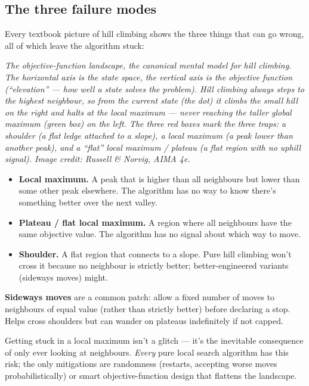 \documentclass[11pt, a4paper]{article}
\begin{document}
\subsection{The three failure modes}

Every textbook picture of hill climbing shows the three things that can go wrong, all of which leave the algorithm stuck:

\begin{center}

\footnotesize\textit{The objective-function landscape, the canonical mental model for hill climbing. The horizontal axis is the \emph{state space}, the vertical axis is the \emph{objective function} (``elevation'' --- how well a state solves the problem). Hill climbing always steps to the highest neighbour, so from the \emph{current state} (the dot) it climbs the small hill on the right and halts at the \emph{local maximum} --- never reaching the taller \emph{global maximum} (green box) on the left. The three red boxes mark the three traps: a \emph{shoulder} (a flat ledge attached to a slope), a \emph{local maximum} (a peak lower than another peak), and a \emph{``flat'' local maximum} / plateau (a flat region with no uphill signal). Image credit: Russell \& Norvig, AIMA 4e.}
\end{center}

\begin{itemize}
  \item \textbf{Local maximum.} A peak that is higher than all neighbours but lower than some other peak elsewhere. The algorithm has no way to know there's something better over the next valley.
  \item \textbf{Plateau / flat local maximum.} A region where all neighbours have the same objective value. The algorithm has no signal about which way to move.
  \item \textbf{Shoulder.} A flat region that connects to a slope. Pure hill climbing won't cross it because no neighbour is strictly better; better-engineered variants (sideways moves) might.
\end{itemize}

\textbf{Sideways moves} are a common patch: allow a fixed number of moves to neighbours of equal value (rather than strictly better) before declaring a stop. Helps cross shoulders but can wander on plateaus indefinitely if not capped.

\begin{pitfallbox}
Getting stuck in a local maximum isn't a glitch — it's the inevitable consequence of only ever looking at neighbours. \emph{Every} pure local search algorithm has this risk; the only mitigations are randomness (restarts, accepting worse moves probabilistically) or smart objective-function design that flattens the landscape.
\end{pitfallbox}
\end{document}
